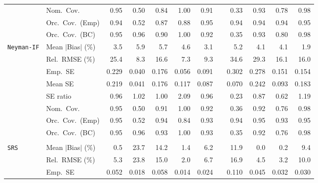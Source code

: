 \begin{landscape}
\begin{longtable}{llrrrrrrrrrr}
 & Nom.\ Cov. & \cellcolor{rankone}0.95 & 0.50 & 0.84 & 1.00 & 0.91 &  & 0.33 & \cellcolor{ranktwo}0.93 & 0.78 & \cellcolor{rankthree}0.98 \\
 & Orc.\ Cov.\ (Emp) & 0.94 & 0.52 & 0.87 & 0.88 & \cellcolor{ranktwo}0.95 &  & 0.94 & \cellcolor{rankthree}0.94 & 0.94 & \cellcolor{rankone}0.95 \\
 & Orc.\ Cov.\ (BC) & \cellcolor{rankone}0.95 & \cellcolor{ranktwo}0.96 & 0.90 & 1.00 & 0.92 &  & 0.35 & \cellcolor{rankthree}0.93 & 0.80 & 0.98 \\
\addlinespace[2pt]
\quad \texttt{Neyman-IF} & Mean $|$Bias$|$ (\%) & \cellcolor{rankthree}3.5 & 5.9 & 5.7 & 4.6 & \cellcolor{ranktwo}3.1 &  & 5.2 & 4.1 & 4.1 & \cellcolor{rankone}1.9 \\
 & Rel.\ RMSE (\%) & 25.4 & \cellcolor{ranktwo}8.3 & 16.6 & \cellcolor{rankone}7.3 & \cellcolor{rankthree}9.3 &  & 34.6 & 29.3 & 16.1 & 16.0 \\
 & Emp.\ SE & 0.229 & 0.040 & 0.176 & 0.056 & 0.091 &  & 0.302 & 0.278 & 0.151 & 0.154 \\
 & Mean SE & 0.219 & 0.041 & 0.176 & 0.117 & 0.087 &  & 0.070 & 0.242 & 0.093 & 0.183 \\
 & SE ratio & \cellcolor{rankthree}0.96 & \cellcolor{ranktwo}1.02 & \cellcolor{rankone}1.00 & 2.09 & 0.96 &  & 0.23 & 0.87 & 0.62 & 1.19 \\
 & Nom.\ Cov. & \cellcolor{rankone}0.95 & 0.50 & 0.91 & 1.00 & \cellcolor{ranktwo}0.92 &  & 0.36 & \cellcolor{rankthree}0.92 & 0.76 & 0.98 \\
 & Orc.\ Cov.\ (Emp) & \cellcolor{rankthree}0.95 & 0.52 & 0.94 & 0.84 & 0.93 &  & 0.94 & \cellcolor{rankone}0.95 & 0.93 & \cellcolor{ranktwo}0.95 \\
 & Orc.\ Cov.\ (BC) & \cellcolor{rankone}0.95 & \cellcolor{ranktwo}0.96 & 0.93 & 1.00 & \cellcolor{rankthree}0.93 &  & 0.35 & 0.92 & 0.76 & 0.98 \\
\addlinespace[2pt]
\multicolumn{12}{l}{\textbf{Continuous Phase-One Covariates}} \\
\addlinespace[2pt]
\quad \texttt{SRS} & Mean $|$Bias$|$ (\%) & \cellcolor{rankthree}0.5 & 23.7 & 14.2 & 1.4 & 6.2 &  & 11.9 & \cellcolor{rankone}0.0 & \cellcolor{ranktwo}0.2 & 9.4 \\
 & Rel.\ RMSE (\%) & 5.3 & 23.8 & 15.0 & \cellcolor{rankone}2.0 & 6.7 &  & 16.9 & \cellcolor{rankthree}4.5 & \cellcolor{ranktwo}3.2 & 10.0 \\
 & Emp.\ SE & 0.052 & 0.018 & 0.058 & 0.014 & 0.024 &  & 0.110 & 0.045 & 0.032 & 0.030 \\

\end{longtable}
\end{landscape}
